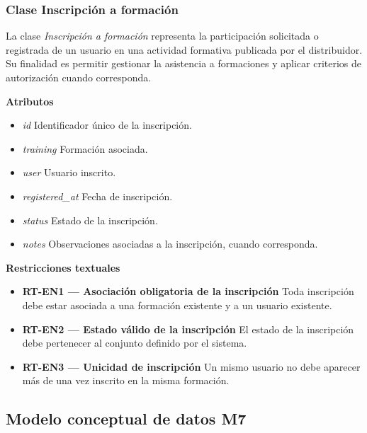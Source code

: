 \subsubsection{Clase Inscripción a formación}

La clase \textit{Inscripción a formación} representa la participación solicitada o registrada de un usuario en una actividad formativa publicada por el distribuidor. Su finalidad es permitir gestionar la asistencia a formaciones y aplicar criterios de autorización cuando corresponda.

\textbf{Atributos}

\begin{itemize}

      \item \textit{id}
            Identificador único de la inscripción.
      \item \textit{training}
            Formación asociada.
      \item \textit{user}
            Usuario inscrito.
      \item \textit{registered\_at}
            Fecha de inscripción.
      \item \textit{status}
            Estado de la inscripción.
      \item \textit{notes}
            Observaciones asociadas a la inscripción, cuando corresponda.

\end{itemize}

\textbf{Restricciones textuales}

\begin{itemize}

      \item \textbf{RT-EN1 — Asociación obligatoria de la inscripción}
            Toda inscripción debe estar asociada a una formación existente y a un usuario existente.
      \item \textbf{RT-EN2 — Estado válido de la inscripción}
            El estado de la inscripción debe pertenecer al conjunto definido por el sistema.
      \item \textbf{RT-EN3 — Unicidad de inscripción}
            Un mismo usuario no debe aparecer más de una vez inscrito en la misma formación.

\end{itemize}

\subsection{Modelo conceptual de datos M7}

